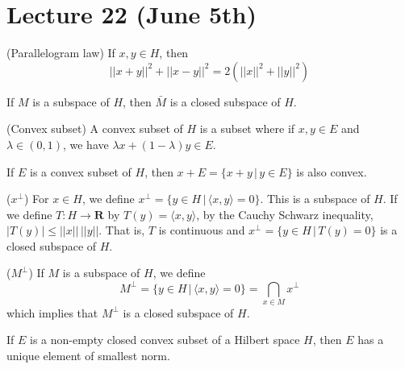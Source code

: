 \section{Lecture 22 (June 5th)}
\begin{thm}
(Parallelogram law) If $x,y\in H$, then
\[||x+y||^2+||x-y||^2=2(||x||^2+||y||^2)\]
\end{thm}
\vspace{2ex}
\begin{prop}
If $M$ is a subspace of $H$, then $\bar{M}$ is a closed subspace of $H$. 
\end{prop}
\vspace{2ex}
\begin{defi}
(Convex subset) A convex subset of $H$ is a subset where if $x,y\in E$ and $\lambda \in (0,1)$, we have $\lambda x+(1-\lambda )y\in E$. 
\end{defi}
\vspace{2ex}
\begin{prop}
If $E$ is a convex subset of $H$, then $x+E=\{x+y \,|\,y\in E \}$ is also convex. 
\end{prop}
\vspace{2ex}
\begin{defi}
($x^{\perp}$) For $x\in H$, we define $x^{\perp}=\{y\in H \,|\,\langle x,y\rangle =0 \}$. This is a subspace of $H$. If we define $T:H\rightarrow {\bm R}$ by $T(y)=\langle x,y\rangle $, by the Cauchy Schwarz inequality, $|T(y)|\leq ||x||\,||y||$. That is, $T$ is continuous and $x^{\perp}=\{y\in H \,|\,T(y)=0 \}$ is a closed subspace of $H$. 
\end{defi}
\vspace{2ex}
\begin{defi}
($M^{\perp}$) If $M$ is a subspace of $H$, we define 
\[M^{\perp}=\{y\in H \,|\, \langle x,y\rangle =0\}=\bigcap _{x\in M}x^{\perp}\]
which implies that $M^{\perp}$ is a closed subspace of $H$.
\end{defi}
\vspace{2ex}
\begin{thm}
If $E$ is a non-empty closed convex subset of a Hilbert space $H$, then $E$ has a unique element of smallest norm.
\end{thm}
\vspace{2ex}
